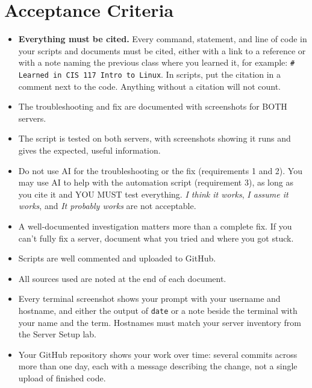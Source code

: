 \documentclass[12pt]{article}
\begin{document}
\section*{Acceptance Criteria}
\begin{itemize}
    \item \textbf{Everything must be cited.} Every command, statement, and line of code in your scripts and documents must be cited, either with a link to a reference or with a note naming the previous class where you learned it, for example: \texttt{\# Learned in CIS 117 Intro to Linux}. In scripts, put the citation in a comment next to the code. Anything without a citation will not count.
    \item The troubleshooting and fix are documented with screenshots for BOTH servers.
    \item The script is tested on both servers, with screenshots showing it runs and gives the expected, useful information.
    \item Do not use AI for the troubleshooting or the fix (requirements 1 and 2). You may use AI to help with the automation script (requirement 3), as long as you cite it and YOU MUST test everything. \textit{I think it works}, \textit{I assume it works}, and \textit{It probably works} are not acceptable.
    \item A well-documented investigation matters more than a complete fix. If you can't fully fix a server, document what you tried and where you got stuck.
    \item Scripts are well commented and uploaded to GitHub.
    \item All sources used are noted at the end of each document.
    \item Every terminal screenshot shows your prompt with your username and hostname, and either the output of \texttt{date} or a note beside the terminal with your name and the term. Hostnames must match your server inventory from the Server Setup lab.
    \item Your GitHub repository shows your work over time: several commits across more than one day, each with a message describing the change, not a single upload of finished code.
\end{itemize}
\end{document}
